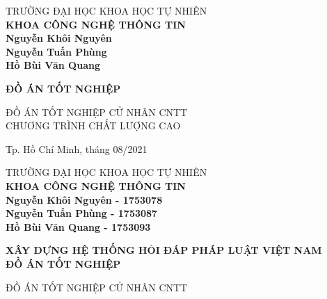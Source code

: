 \begin{titlepage}

\begin{center}

TRƯỜNG ĐẠI HỌC KHOA HỌC TỰ NHIÊN\\
\textbf{KHOA CÔNG NGHỆ THÔNG TIN}\\[2cm]


{ \Large \bfseries Nguyễn Khôi Nguyên\\ } 
{ \Large \bfseries Nguyễn Tuấn Phùng\\} 
{ \Large \bfseries Hồ Bùi Văn Quang\\[1cm] } 


{ \Large \bfseries ĐỒ ÁN TỐT NGHIỆP\\[3cm]} 


\large ĐỒ ÁN TỐT NGHIỆP CỬ NHÂN CNTT\\


\large CHƯƠNG TRÌNH CHẤT LƯỢNG CAO\\



\vfill
Tp. Hồ Chí Minh, tháng 08/2021

\end{center}

\pagebreak

\begin{center}

TRƯỜNG ĐẠI HỌC KHOA HỌC TỰ NHIÊN\\
\textbf{KHOA CÔNG NGHỆ THÔNG TIN}\\[2cm]


{\large \bfseries Nguyễn Khôi Nguyên - 1753078\\} 
{\large \bfseries Nguyễn Tuấn Phùng - 1753087\\} 
{\large \bfseries Hồ Bùi Văn Quang - 1753093\\[2cm]}


{ \Large \bfseries XÂY DỰNG HỆ THỐNG HỎI ĐÁP PHÁP LUẬT VIỆT NAM\\ĐỒ ÁN TỐT NGHIỆP\\[1cm] } 




\large ĐỒ ÁN TỐT NGHIỆP CỬ NHÂN CNTT\\


\end{center}
\end{titlepage}
